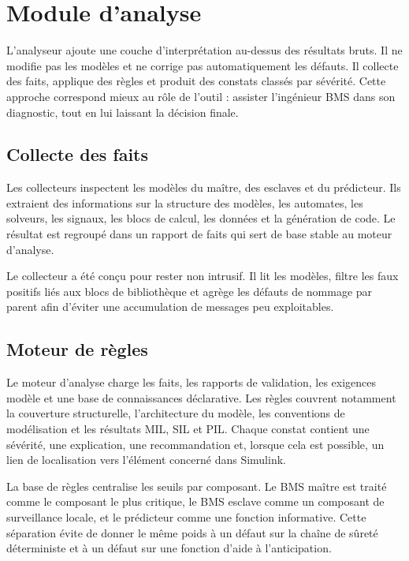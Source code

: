 \section{Module d'analyse}
\label{sec:ch5_analyseur}

L'analyseur ajoute une couche d'interprétation au-dessus des résultats bruts. Il ne modifie pas les modèles et ne corrige pas automatiquement les défauts. Il collecte des faits, applique des règles et produit des constats classés par sévérité. Cette approche correspond mieux au rôle de l'outil : assister l'ingénieur BMS dans son diagnostic, tout en lui laissant la décision finale.

\subsection{Collecte des faits}
\label{subsec:ch5_collecte_faits}

Les collecteurs inspectent les modèles du maître, des esclaves et du prédicteur. Ils extraient des informations sur la structure des modèles, les automates, les solveurs, les signaux, les blocs de calcul, les données et la génération de code. Le résultat est regroupé dans un rapport de faits qui sert de base stable au moteur d'analyse.

\noindent
Le collecteur a été conçu pour rester non intrusif. Il lit les modèles, filtre les faux positifs liés aux blocs de bibliothèque et agrège les défauts de nommage par parent afin d'éviter une accumulation de messages peu exploitables.

\subsection{Moteur de règles}
\label{subsec:ch5_moteur_regles}

Le moteur d'analyse charge les faits, les rapports de validation, les exigences modèle et une base de connaissances déclarative. Les règles couvrent notamment la couverture structurelle, l'architecture du modèle, les conventions de modélisation et les résultats MIL, SIL et PIL. Chaque constat contient une sévérité, une explication, une recommandation et, lorsque cela est possible, un lien de localisation vers l'élément concerné dans Simulink.

\noindent
La base de règles centralise les seuils par composant. Le BMS maître est traité comme le composant le plus critique, le BMS esclave comme un composant de surveillance locale, et le prédicteur comme une fonction informative. Cette séparation évite de donner le même poids à un défaut sur la chaîne de sûreté déterministe et à un défaut sur une fonction d'aide à l'anticipation.

